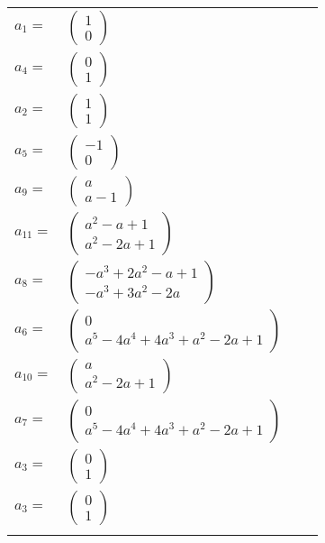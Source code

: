 \documentclass[1p]{elsarticle_modified}
\theoremstyle{definition}
\begin{document}
\begin{tabular}{m{7pt} m{180pt} m{7pt} m{180pt} }
\flushright $a_{1}=$&$\begin{pmatrix}1\\0\end{pmatrix}$ \\
\flushright $a_{4}=$&$\begin{pmatrix}0\\1\end{pmatrix}$ \\
\flushright $a_{2}=$&$\begin{pmatrix}1\\1\end{pmatrix}$ \\
\flushright $a_{5}=$&$\begin{pmatrix}-1\\0\end{pmatrix}$ \\
\flushright $a_{9}=$&$\begin{pmatrix}a\\a-1\end{pmatrix}$ \\
\flushright $a_{11}=$&$\begin{pmatrix}a^2- a+1\\a^2-2 a+1\end{pmatrix}$ \\
\flushright $a_{8}=$&$\begin{pmatrix}- a^3+2 a^2- a+1\\- a^3+3 a^2-2 a\end{pmatrix}$ \\
\flushright $a_{6}=$&$\begin{pmatrix}0\\a^5-4 a^4+4 a^3+a^2-2 a+1\end{pmatrix}$ \\
\flushright $a_{10}=$&$\begin{pmatrix}a\\a^2-2 a+1\end{pmatrix}$ \\
\flushright $a_{7}=$&$\begin{pmatrix}0\\a^5-4 a^4+4 a^3+a^2-2 a+1\end{pmatrix}$ \\
\flushright $a_{3}=$&$\begin{pmatrix}0\\1\end{pmatrix}$\\ \flushright $a_{3}=$&$\begin{pmatrix}0\\1\end{pmatrix}$\\&\end{tabular}
\end{document}
